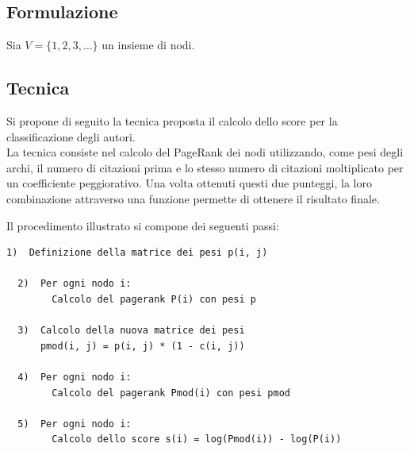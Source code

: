 \documentclass[a4paper, 12pt]{article}
\begin{document}
\subsection{Formulazione}
Sia $ V = \{ 1, 2, 3, \ldots \} $ un insieme di nodi.
\pagebreak
\subsection{Tecnica}
Si propone di seguito la tecnica proposta il calcolo dello score per la classificazione degli autori. \\
La tecnica consiste nel calcolo del PageRank dei nodi utilizzando, come pesi degli archi, il numero di citazioni prima e lo stesso numero di citazioni moltiplicato per un coefficiente peggiorativo. Una volta ottenuti questi due punteggi, la loro combinazione attraverso una funzione permette di ottenere il risultato finale.
\par
Il procedimento illustrato si compone dei seguenti passi:
\begin{lstlisting}[keepspaces=true]
  1)  Definizione della matrice dei pesi p(i, j)
  
  2)  Per ogni nodo i:
        Calcolo del pagerank P(i) con pesi p 

  3)  Calcolo della nuova matrice dei pesi 
      pmod(i, j) = p(i, j) * (1 - c(i, j))
      
  4)  Per ogni nodo i:
        Calcolo del pagerank Pmod(i) con pesi pmod
        
  5)  Per ogni nodo i:
        Calcolo dello score s(i) = log(Pmod(i)) - log(P(i))
\end{lstlisting}
\end{document}
